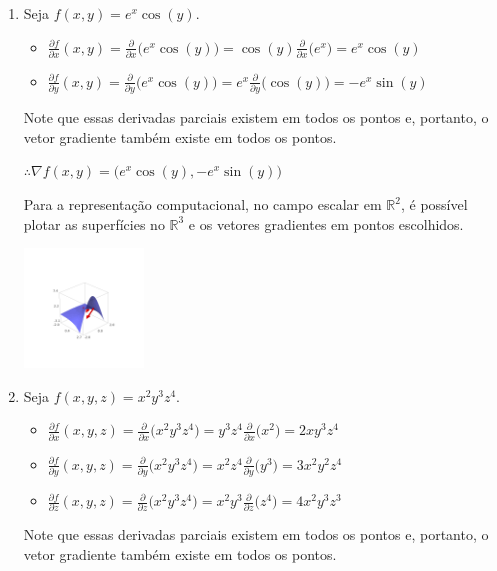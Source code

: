 \documentclass[../main.tex]{subfiles}
\begin{document}
\begin{solucao}
\begin{enumerate}[label=\arabic.]
\begin{enumerate}[label=\alph*)]
						\item Seja $f(x,y)=e^x\cos(y)$.
							\begin{itemize}
								\item $\frac{\partial f}{\partial x}(x,y)=\frac{\partial }{\partial x}\big(e^x\cos(y)\big)=\cos(y)\frac{\partial }{\partial x}\big(e^x\big)=e^x\cos(y)$
								\item $\frac{\partial f}{\partial y}(x,y)=\frac{\partial }{\partial y}\big(e^x\cos(y)\big)=e^x\frac{\partial }{\partial y}\big(\cos(y)\big)=-e^x\sin(y)$
							\end{itemize}
							Note que essas derivadas parciais existem em todos os pontos e, portanto, o vetor gradiente também existe em todos os pontos.
							
							$\therefore \nabla f(x,y)=\big(e^x\cos(y), -e^x\sin(y)\big)$
							
							Para a representação computacional, no campo escalar em $\mathbb{R}^2$, é possível plotar as superfícies no $\mathbb{R}^3$ e os vetores gradientes em pontos escolhidos.
							
							\begin{center}
								\includegraphics[width=0.25\textwidth]{imagens/lista04/picture_lista04.02_q02_item01.02.png}
							\end{center}
							
						\item Seja $f(x,y,z)=x^2y^3z^4$.
						\begin{itemize}
							\item $\frac{\partial f}{\partial x}(x,y,z)=\frac{\partial }{\partial x}\big(x^2y^3z^4\big)=y^3z^4\frac{\partial }{\partial x}\big(x^2\big)=2xy^3z^4$
							\item $\frac{\partial f}{\partial y}(x,y,z)=\frac{\partial }{\partial y}\big(x^2y^3z^4\big)=x^2z^4\frac{\partial }{\partial y}\big(y^3\big)=3x^2y^2z^4$
							\item $\frac{\partial f}{\partial z}(x,y,z)=\frac{\partial }{\partial z}\big(x^2y^3z^4\big)=x^2y^3\frac{\partial }{\partial z}\big(z^4\big)=4x^2y^3z^3$
						\end{itemize}
						Note que essas derivadas parciais existem em todos os pontos e, portanto, o vetor gradiente também existe em todos os pontos.
						

\end{enumerate}
\end{enumerate}
\end{solucao}
\end{document}
